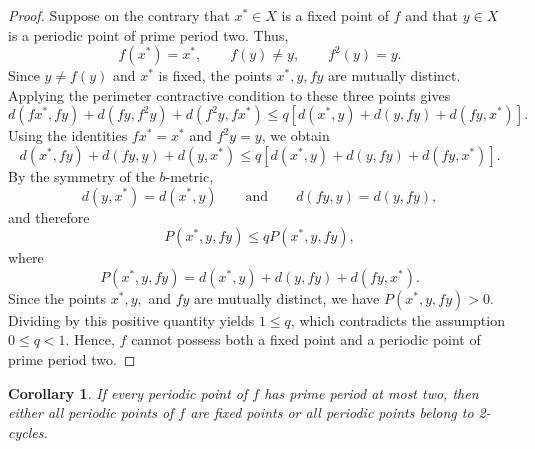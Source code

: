 \documentclass[a4paper,12pt,oneside]{article}
\newtheorem{lemma}[theorem]{Lemma}
\newtheorem{corollary}[theorem]{Corollary}
\numberwithin{equation}{section}
\begin{document}
\begin{proof}
Suppose on the contrary that $x^{*}\in X$ is a fixed point of $f$ and that $y\in X$ is a periodic point of prime period two. Thus,
\[
f(x^{*}) = x^{*},\qquad f(y)\neq y,\qquad f^{2}(y) = y.
\]
Since $y\neq f(y)$ and $x^{*}$ is fixed, the points $x^{*},y,f y$ are mutually distinct. Applying the perimeter contractive condition to these three points gives
\[
d(fx^{*},fy) + d(fy,f^{2}y) + d(f^{2}y,fx^{*})\leq q[d(x^{*},y) + d(y,fy) + d(fy,x^{*})].
\]
Using the identities $f x^{*} = x^{*}$ and $f^{2}y = y$, we obtain
\[
d(x^{*},fy) + d(fy,y) + d(y,x^{*})\leq q[d(x^{*},y) + d(y,fy) + d(fy,x^{*})].
\]
By the symmetry of the $b$-metric,
\[
d(y,x^{*}) = d(x^{*},y)\qquad \text{and}\qquad d(fy,y) = d(y,fy),
\]
and therefore
\[
P(x^{*},y,f y)\leq q P(x^{*},y,f y),
\]
where
\[
P(x^{*},y,f y) = d(x^{*},y) + d(y,f y) + d(fy,x^{*}).
\]
Since the points $x^{*},y,$ and $f y$ are mutually distinct, we have $P(x^{*},y,f y) > 0$. Dividing by this positive quantity yields $1\leq q$, which contradicts the assumption $0\leq q<1$. Hence, $f$ cannot possess both a fixed point and a periodic point of prime period two.
\end{proof}

\begin{corollary}
\label{cor:dichotomy}
If every periodic point of $f$ has prime period at most two, then either all periodic points of $f$ are fixed points or all periodic points belong to 2-cycles.
\end{corollary}



\end{document}
